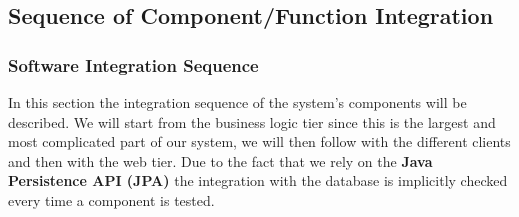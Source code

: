 \subsection{Sequence of Component/Function Integration}

\subsubsection{Software Integration Sequence}
In this section the integration sequence of the system's components will be
described. We will start from the business logic tier since this is the
largest and most complicated part of our system, we will then follow with the
different clients and then with the web tier. Due to the fact that we rely on the
\textbf{Java Persistence API (JPA)} the integration with the database is
implicitly checked every time a component is tested.


